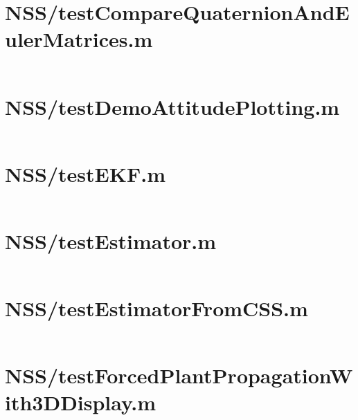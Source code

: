 \pagebreak
\section*{NSS/testCompareQuaternionAndEulerMatrices.m}\label{code:NSS/testCompareQuaternionAndEulerMatrices.m}
\inputminted[linenos,fontsize=\scriptsize]{matlab}{/home/dcouture/git/mathyourlife/TSatPy/beta_versions/matlab_object_oriented/testCompareQuaternionAndEulerMatrices.m}

\pagebreak
\section*{NSS/testDemoAttitudePlotting.m}\label{code:NSS/testDemoAttitudePlotting.m}
\inputminted[linenos,fontsize=\scriptsize]{matlab}{/home/dcouture/git/mathyourlife/TSatPy/beta_versions/matlab_object_oriented/testDemoAttitudePlotting.m}

\pagebreak
\section*{NSS/testEKF.m}\label{code:NSS/testEKF.m}
\inputminted[linenos,fontsize=\scriptsize]{matlab}{/home/dcouture/git/mathyourlife/TSatPy/beta_versions/matlab_object_oriented/testEKF.m}

\pagebreak
\section*{NSS/testEstimator.m}\label{code:NSS/testEstimator.m}
\inputminted[linenos,fontsize=\scriptsize]{matlab}{/home/dcouture/git/mathyourlife/TSatPy/beta_versions/matlab_object_oriented/testEstimator.m}

\pagebreak
\section*{NSS/testEstimatorFromCSS.m}\label{code:NSS/testEstimatorFromCSS.m}
\inputminted[linenos,fontsize=\scriptsize]{matlab}{/home/dcouture/git/mathyourlife/TSatPy/beta_versions/matlab_object_oriented/testEstimatorFromCSS.m}

\pagebreak
\section*{NSS/testForcedPlantPropagationWith3DDisplay.m}\label{code:NSS/testForcedPlantPropagationWith3DDisplay.m}
\inputminted[linenos,fontsize=\scriptsize]{matlab}{/home/dcouture/git/mathyourlife/TSatPy/beta_versions/matlab_object_oriented/testForcedPlantPropagationWith3DDisplay.m}

